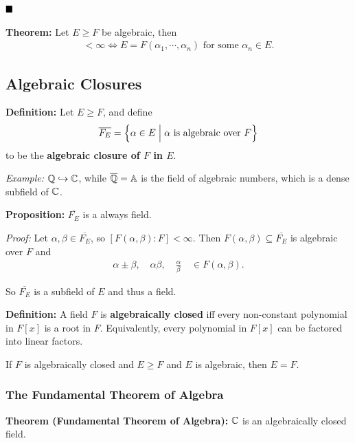 \(\qed\)

\textbf{Theorem:} Let \(E \geq F\) be algebraic, then
\begin{align*}
[E: F] < \infty \iff E = F(\alpha_1, \cdots, \alpha_n)
\text{ for some }
\alpha_n \in E
.\end{align*}

\hypertarget{algebraic-closures}{%
\subsection{Algebraic Closures}\label{algebraic-closures}}

\textbf{Definition:} Let \(E \geq F\), and define
\begin{align*}
\overline{F_E} = \left\{{\alpha \in E \mathrel{\Big|} \alpha \text{ is algebraic over } F}\right\}
\end{align*} to be the \textbf{algebraic closure of \(F\) in \(E\)}.

\emph{Example:} \({\mathbb{Q}} \hookrightarrow {\mathbb{C}}\), while \(\overline {{\mathbb{Q}}} = \Bbb{A}\)
is the field of algebraic numbers, which is a dense subfield of \({\mathbb{C}}\).

\textbf{Proposition:} \(\overline{F_E}\) is a always field.

\emph{Proof:} Let \(\alpha, \beta \in \overline{F_E}\), so
\([F(\alpha, \beta): F] < \infty\). Then
\(F(\alpha, \beta) \subseteq \overline{F_E}\) is algebraic over \(F\)
and
\begin{align*}
\alpha\pm \beta, \quad \alpha\beta,\quad \frac \alpha \beta \quad  \in F(\alpha, \beta)
.\end{align*}

So \(\overline{F_E}\) is a subfield of \(E\) and thus a field.

\textbf{Definition:} A field \(F\) is \textbf{algebraically closed} iff
every non-constant polynomial in \(F[x]\) is a root in \(F\).
Equivalently, every polynomial in \(F[x]\) can be factored into linear
factors.

If \(F\) is algebraically closed and \(E\geq F\) and \(E\) is algebraic,
then \(E=F\).

\hypertarget{the-fundamental-theorem-of-algebra}{%
\subsubsection{The Fundamental Theorem of
Algebra}\label{the-fundamental-theorem-of-algebra}}

\textbf{Theorem (Fundamental Theorem of Algebra):} \({\mathbb{C}}\) is an
algebraically closed field.

